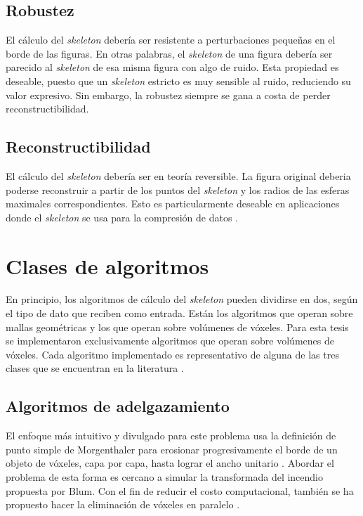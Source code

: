 \subsection{Robustez}

El cálculo del \textit{skeleton} debería ser resistente a perturbaciones pequeñas en el borde de las figuras. En otras palabras, el \textit{skeleton} de una figura debería ser parecido al \textit{skeleton} de esa misma figura con algo de ruido. Esta propiedad es deseable, puesto que un \textit{skeleton} estricto es muy sensible al ruido, reduciendo su valor expresivo. Sin embargo, la robustez siempre se gana a costa de perder reconstructibilidad.

\subsection{Reconstructibilidad}

El cálculo del \textit{skeleton} debería ser en teoría reversible. La figura original deberia poderse reconstruir a partir de los puntos del \textit{skeleton} y los radios de las esferas maximales correspondientes. Esto es particularmente deseable en aplicaciones donde el \textit{skeleton} se usa para la compresión de datos \cite{lien2007skeleton,huang1990astronomical}.

\section{Clases de algoritmos}

En principio, los algoritmos de cálculo del \textit{skeleton} pueden dividirse en dos, según el tipo de dato que reciben como entrada. Están los algoritmos que operan sobre mallas geométricas y los que operan sobre volúmenes de vóxeles. Para esta tesis se implementaron exclusivamente algoritmos que operan sobre volúmenes de vóxeles. Cada algoritmo implementado es representativo de alguna de las tres clases que se encuentran en la literatura \cite{cornea2007curve, Saha2015, tagliasacchi20163d}.

\subsection{Algoritmos de adelgazamiento}

El enfoque más intuitivo y divulgado para este problema usa la definición de punto simple de Morgenthaler \cite{lam1992thinning,university1981three,saha1994topology} para erosionar progresivamente el borde de un objeto de vóxeles, capa por capa, hasta lograr el ancho unitario \cite{hilitch1969linear,lobregt1980three,arcelli1985width,borgefors1999computing}. Abordar el problema de esta forma es cercano a simular la transformada del incendio propuesta por Blum. Con el fin de reducir el costo computacional, también se ha propuesto hacer la eliminación de vóxeles en paralelo \cite{gong1990simple,saha1997new,palagyi1999parallel}.


